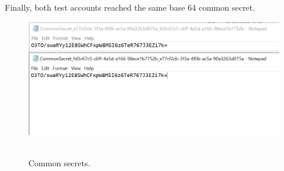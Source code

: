 \documentclass[12pt,letterpaper,oneside,reqno]{amsart}
\numberwithin{equation}{section}
\begin{document}
    Finally, both test accounts reached the same base 64 common secret.
    \begin{figure}[H]
        \centering
        \includegraphics[width=1\textwidth]{Pictures/Same_common_secret}
        ~\caption{Common secrets.}\label{fig:figure2}
    \end{figure}

    
    
\end{document}

